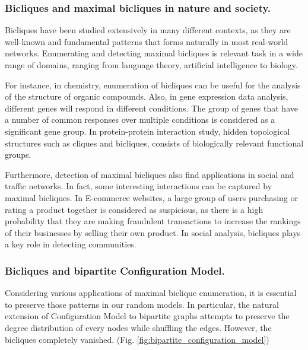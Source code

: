 \documentclass[table]{report}
\begin{document}
\subsubsection{Bicliques and maximal bicliques in nature and society.}
Bicliques have been studied extensively in many different contexts, as they are well-known and fundamental patterns that forms naturally in most real-world networks. Enumerating and detecting maximal bicliques is relevant task in a wide range of domains, ranging from language theory, artificial intelligence to biology.

\medbreak
For instance, in chemistry, enumeration of bicliques can be useful for the analysis of the structure of organic compounds. Also, in gene expression data analysis, different genes will respond in different conditions. The group of genes that have a number of common responses over multiple conditions is considered as a significant gene group. In protein-protein interaction study, hidden topological structures such as cliques and bicliques, consists of biologically relevant functional groups.


Furthermore, detection of maximal bicliques also find applications in social and traffic networks. In fact, some interesting interactions can be captured by maximal bicliques. In E-commerce websites, a large group of users purchasing or rating a product together is considered as suspicious, as there is a high probability that they are making fraudulent transactions to increase the
rankings of their businesses by selling their own product.  In social analysis, bicliques plays a key role in detecting communities.


\medbreak

\subsubsection{Bicliques and bipartite Configuration Model. }
Considering various applications of maximal biclique enumeration, it is essential to preserve those patterns in our random models. In particular, the natural extension of Configuration Model to bipartite graphs attempts to preserve the degree distribution of every nodes while shuffling the edges. However, the bicliques completely vanished.  (Fig. \ref{fig:bipartite_configuration_model})

%
%
%
%
%
\end{document}
